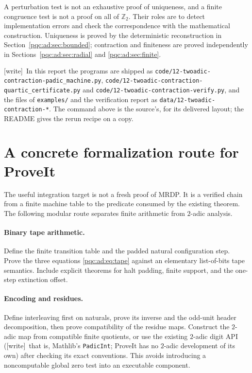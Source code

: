 \documentclass[11pt,letterpaper]{article}
\numberwithin{equation}{section}
\theoremstyle{definition}
\theoremstyle{remark}
\newcommand{\code}[1]{\nolinkurl{#1}}
\newcommand{\wtag}{\textup{[write]}}
\newcommand{\srcmark}[1]{\par\noindent{\small\itshape [source~#1]}\par}
\newcommand{\Ztwo}{\mathbb Z_2}
\begin{document}
A perturbation test is not an exhaustive proof of uniqueness, and a finite
congruence test is not a proof on all of $\Ztwo$. Their roles are to detect
implementation errors and check the correspondence with the mathematical
construction. Uniqueness is proved by the deterministic reconstruction in
Section~\ref{pqc:ad:sec:bounded}; contraction and finiteness are proved independently
in Sections~\ref{pqc:ad:sec:radial} and \ref{pqc:ad:sec:finite}.

\wtag\ In this report the programs are shipped as
\code{code/12-twoadic-contraction-padic_machine.py},
\code{code/12-twoadic-contraction-quartic_certificate.py} and
\code{code/12-twoadic-contraction-verify.py}, and the files of \code{examples/}
and the verification report as \code{data/12-twoadic-contraction-*}. The
command above is the source's, for its delivered layout; the README gives the
rerun recipe on a copy.

\section{A concrete formalization route for ProveIt}\label{pqc:ad:sec:formalization}
\srcmark{12}

The useful integration target is not a fresh proof of MRDP. It is a
verified chain from a finite machine table to the predicate consumed by
the existing theorem. The following modular route separates finite
arithmetic from $2$-adic analysis.

\paragraph{Binary tape arithmetic.}
Define the finite transition table and the padded natural configuration
step. Prove the three equations \eqref{pqc:ad:eq:tape} against an elementary
list-of-bits tape semantics. Include explicit theorems for halt padding,
finite support, and the one-step extinction offset.

\paragraph{Encoding and residues.}
Define interleaving first on naturals, prove its inverse and the odd-unit
header decomposition, then prove compatibility of the residue maps.
Construct the $2$-adic map from compatible finite quotients, or use the
existing $2$-adic digit API (\wtag\ that is, Mathlib's \code{PadicInt}; ProveIt has no $2$-adic development of its own) after checking its exact conventions. This
avoids introducing a noncomputable global zero test into an executable
component.
\end{document}
